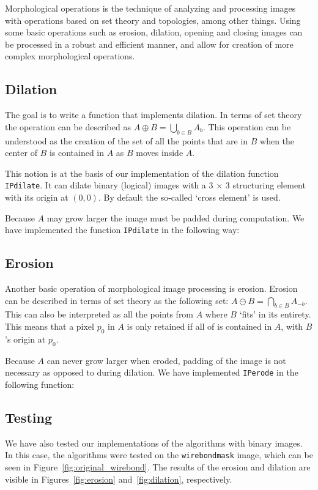 Morphological operations is the technique of analyzing and processing images with operations based on set theory and topologies, among other things.
Using some basic operations such as erosion, dilation, opening and closing images can be processed in a robust and efficient manner, and allow for creation of more complex morphological operations.

\subsection{Dilation}
The goal is to write a function that implements dilation.
In terms of set theory the operation can be described as \(A \oplus B = \underset{b \in B}\bigcup A_b\).
This operation can be understood as the creation of the set of all the points that are in \(B\) when the center of \(B\) is contained in \(A\) as \(B\) moves inside \(A\).

This notion is at the basis of our implementation of the dilation function \texttt{IPdilate}.
It can dilate binary (logical) images with a 3 \(\times\) 3 structuring element with its origin at \((0, 0)\).
By default the so-called `cross element' is used.

Because \(A\) may grow larger the image must be padded during computation.
We have implemented the function \texttt{IPdilate} in the following way:
\subsection{Erosion}
Another basic operation of morphological image processing is erosion.
Erosion can be described in terms of set theory as the following set: \(A \ominus B = \underset{b \in B}\bigcap A_{-b}\).
This can also be interpreted as all the points from \(A\) where \(B\) `fits' in its entirety.
This means that a pixel \(p_0\) in \(A\) is only retained if all of is contained in \(A\), with \(B\)'s origin at \(p_0\).

Because \(A\) can never grow larger when eroded, padding of the image is not necessary as opposed to during dilation. We have implemented \texttt{IPerode} in the following function:
\clearpage
\subsection{Testing}
We have also tested our implementations of the algorithms with binary images.
In this case, the algorithms were tested on the \texttt{wirebondmask} image, which can be seen in Figure~\ref{fig:original_wirebond}.
The results of the erosion and dilation are visible in Figures~\ref{fig:erosion} and~\ref{fig:dilation}, respectively.

